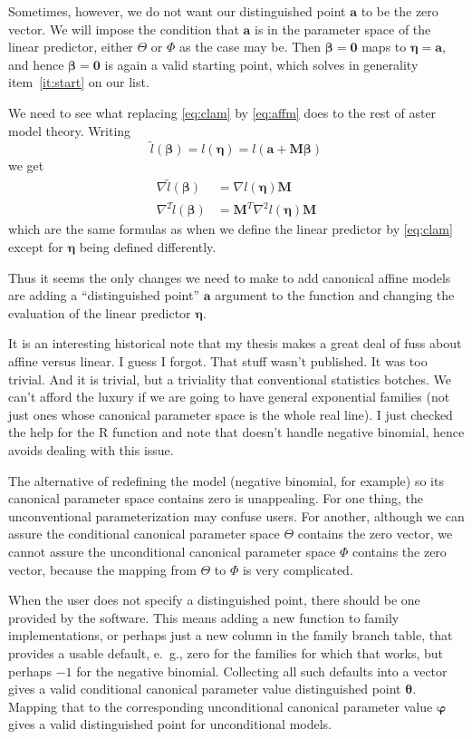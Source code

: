 \documentclass[11pt]{article}
\newcommand{\boldbeta}{\boldsymbol{\beta}}
\newcommand{\boldeta}{\boldsymbol{\eta}}
\newcommand{\boldtheta}{\boldsymbol{\theta}}
\newcommand{\boldvarphi}{\boldsymbol{\varphi}}
\newcommand{\bolda}{\mathbf{a}}
\newcommand{\boldM}{\mathbf{M}}
\newcommand{\boldzero}{\boldsymbol{0}}
\begin{document}
Sometimes, however, we do not want our distinguished point $\bolda$ to
be the zero vector.  We will impose the condition that $\bolda$ is in
the parameter space of the linear predictor, either $\Theta$ or $\Phi$
as the case may be.  Then $\boldbeta = \boldzero$ maps to $\boldeta = \bolda$,
and hence $\boldbeta = \boldzero$ is again a valid starting point, which solves
in generality item~\ref{it:start} on our list.

We need to see what replacing \eqref{eq:clam} by \eqref{eq:affm} does to
the rest of aster model theory.  Writing
$$
   \tilde{l}(\boldbeta) = l(\boldeta) = l(\bolda + \boldM \boldbeta)
$$
we get
\begin{align*}
   \nabla \tilde{l}(\boldbeta) & = \nabla l(\boldeta) \boldM
   \\
   \nabla^2 \tilde{l}(\boldbeta) & = \boldM^T \nabla^2 l(\boldeta) \boldM
\end{align*}
which are the same formulas as when we define the linear predictor
by \eqref{eq:clam} except for $\boldeta$ being defined differently.

Thus it seems the only changes we need to make to add canonical affine models
are adding a ``distinguished point'' $\bolda$ argument to the \verb@aster@
function and changing the evaluation of the linear predictor $\boldeta$.

It is an interesting historical note that my thesis makes a great deal of
fuss about affine versus linear.  I guess I forgot.  That stuff wasn't
published.  It was too trivial.  And it is trivial, but a triviality that
conventional statistics botches.  We can't afford the luxury if we are
going to have general exponential families (not just ones whose canonical
parameter space is the whole real line).  I just checked the help for
the R \verb@family@ function and note that \verb@glm@ doesn't handle negative
binomial, hence avoids dealing with this issue.

The alternative of redefining the model (negative binomial, for example)
so its canonical parameter space contains zero is unappealing.  For one
thing, the unconventional parameterization may confuse users.  For another,
although we can assure the conditional canonical parameter space $\Theta$
contains the zero vector, we cannot assure the unconditional canonical
parameter space $\Phi$ contains the zero vector, because the mapping from
$\Theta$ to $\Phi$ is very complicated.

When the user does not specify a distinguished point, there should be one
provided by the software.  This means adding a new function to family
implementations, or perhaps just a new column in the family branch table,
that provides a usable default, e.~g., zero for the families for which that
works, but perhaps $- 1$ for the negative binomial.  Collecting all such
defaults into a vector gives a valid conditional canonical parameter value
distinguished point $\boldtheta$.  Mapping that to the corresponding
unconditional canonical parameter value $\boldvarphi$ gives a valid
distinguished point for unconditional models.
\end{document}
